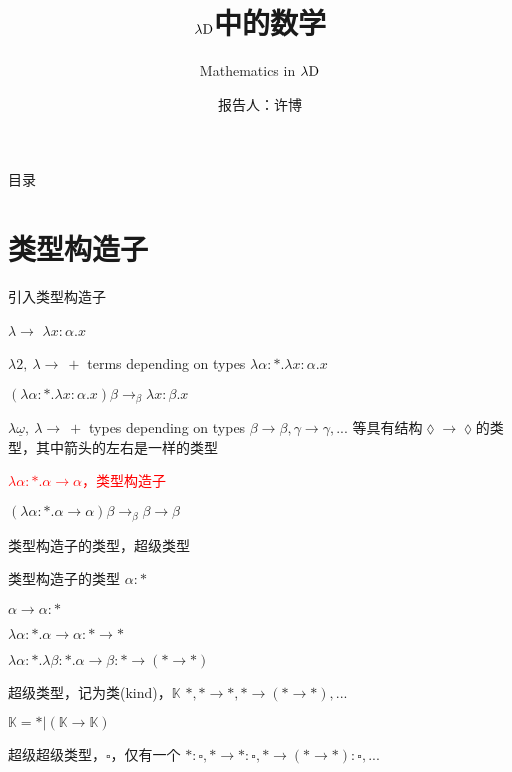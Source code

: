 \documentclass[UTF8,aspectratio=169,mathserif]{beamer}
\title{$\lambda{\rm D}$中的数学}
\subtitle{Mathematics in $\lambda{\rm D}$}
\author{报告人：许博}
\date{}
\begin{document}
	
	\begin{frame}
		\titlepage
	\end{frame}

	\begin{frame}{目录}
		\tableofcontents
	\end{frame}

	\section{类型构造子}
		\begin{frame}{引入类型构造子}
			\begin{block}{$\lambda{\rightarrow}$}
				$\lambda x:\alpha.x$
			\end{block}
			
			\begin{block}{$\lambda{2},\ \lambda{\rightarrow}\ + $ terms depending on types}
				$\lambda\alpha:*.\lambda x:\alpha.x$
				
				$(\lambda\alpha:*.\lambda x:\alpha.x)\beta\rightarrow_\beta\lambda x:\beta.x$
			\end{block}
		
			\begin{block}{$\lambda{\underline{\omega}},\ \lambda{\rightarrow}\ + $ types depending on types}
				$\beta\rightarrow\beta,\gamma\rightarrow\gamma,...$ 等具有结构$\lozenge\rightarrow\lozenge$的类型，其中箭头的左右是一样的类型
				
				\textcolor{red}{$\lambda\alpha:*.\alpha\rightarrow\alpha$，类型构造子}
				
				$(\lambda\alpha:*.\alpha\rightarrow\alpha)\beta\rightarrow_\beta\beta\rightarrow\beta$
			\end{block}
		\end{frame}
	
		\begin{frame}[shrink]{类型构造子的类型，超级类型}
			\begin{block}{类型构造子的类型}
				$\alpha:*$
				
				$\alpha\rightarrow\alpha:*$
				
				$\lambda\alpha:*.\alpha\rightarrow\alpha:*\rightarrow*$
				
				$\lambda\alpha:*.\lambda\beta:*.\alpha\rightarrow\beta:*\rightarrow(*\rightarrow*)$
			\end{block}
			\begin{block}{超级类型，记为类(kind)，$\mathbb{K}$}
				$*, *\rightarrow*, *\rightarrow(*\rightarrow*), ...$
				
				$\mathbb{K}=*|(\mathbb{K}\rightarrow\mathbb{K})$
			\end{block}
			\begin{block}{超级超级类型，$\square$，仅有一个}
				$*:\square, *\rightarrow*:\square, *\rightarrow(*\rightarrow*):\square, ...$
			\end{block}
		\end{frame}
	
\end{document}
